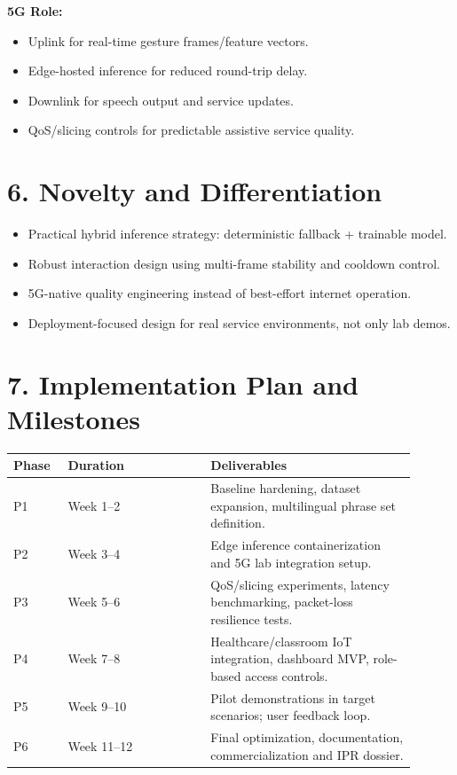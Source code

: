 \documentclass[11pt,a4paper]{article}
\begin{document}
\textbf{5G Role:}
\begin{itemize}
    \item Uplink for real-time gesture frames/feature vectors.
    \item Edge-hosted inference for reduced round-trip delay.
    \item Downlink for speech output and service updates.
    \item QoS/slicing controls for predictable assistive service quality.
\end{itemize}

\section*{6. Novelty and Differentiation}
\begin{itemize}
    \item Practical hybrid inference strategy: deterministic fallback + trainable model.
    \item Robust interaction design using multi-frame stability and cooldown control.
    \item 5G-native quality engineering instead of best-effort internet operation.
    \item Deployment-focused design for real service environments, not only lab demos.
\end{itemize}

\section*{7. Implementation Plan and Milestones}
\begin{longtable}{p{0.12\linewidth} p{0.32\linewidth} p{0.46\linewidth}}
\toprule
\textbf{Phase} & \textbf{Duration} & \textbf{Deliverables} \\
\midrule
P1 & Week 1--2 & Baseline hardening, dataset expansion, multilingual phrase set definition. \\
P2 & Week 3--4 & Edge inference containerization and 5G lab integration setup. \\
P3 & Week 5--6 & QoS/slicing experiments, latency benchmarking, packet-loss resilience tests. \\
P4 & Week 7--8 & Healthcare/classroom IoT integration, dashboard MVP, role-based access controls. \\
P5 & Week 9--10 & Pilot demonstrations in target scenarios; user feedback loop. \\
P6 & Week 11--12 & Final optimization, documentation, commercialization and IPR dossier. \\
\bottomrule
\end{longtable}
\end{document}
